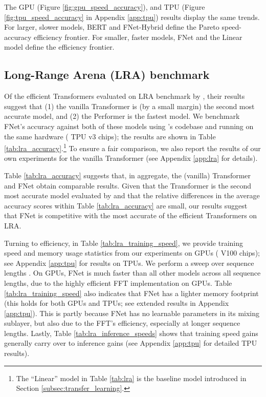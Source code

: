 \documentclass[11pt]{article}
\begin{document}
The GPU (Figure \ref{fig:gpu_speed_accuracy}), and TPU (Figure \ref{fig:tpu_speed_accuracy} in Appendix \ref{app:tpu}) results display the same trends. For larger, slower models, BERT and FNet-Hybrid define the Pareto speed-accuracy efficiency frontier. For smaller, faster models, FNet and the Linear model define the efficiency frontier.

\subsection{Long-Range Arena (LRA) benchmark}
\label{subsec:lra}

Of the efficient Transformers evaluated on LRA benchmark by \citet{tay2020long}, their results suggest that (1) the vanilla Transformer is (by a small margin) the second most accurate model, and (2) the Performer \citep{choromanski2020rethinking} is the fastest model.  We benchmark FNet's accuracy against both of these models using \citet{tay2020long}'s codebase and running on the same hardware ( TPU v3 chips); the results are shown in Table \ref{tab:lra_accuracy}.\footnote{The ``Linear'' model in Table \ref{tab:lra} is the baseline model introduced in Section \ref{subsec:transfer_learning}.} To ensure a fair comparison, we also report the results of our own experiments for the vanilla Transformer (see Appendix \ref{app:lra} for details). 

Table \ref{tab:lra_accuracy} suggests that, in aggregate, the (vanilla) Transformer and FNet obtain comparable results. Given that the Transformer is the second most accurate model evaluated by \citet{tay2020long} and that the relative differences in the average accuracy scores within Table \ref{tab:lra_accuracy} are small, our results suggest that FNet is competitive with the most accurate of the efficient Transformers on LRA.

Turning to efficiency, in Table \ref{tab:lra_training_speed}, we provide training speed and memory usage statistics from our experiments on GPUs ( V100 chips); see Appendix \ref{app:tpu} for results on TPUs. We perform a sweep over sequence lengths . On GPUs, FNet is much faster than all other models across all sequence lengths, due to the highly efficient FFT implementation on GPUs.  Table \ref{tab:lra_training_speed} also indicates that FNet has a lighter memory footprint (this holds for both GPUs and TPUs; see extended results in Appendix \ref{app:tpu}). This is partly because FNet has no learnable parameters in its mixing sublayer, but also due to the FFT's efficiency, especially at longer sequence lengths. Lastly, Table \ref{tab:lra_inference_speeds} shows that training speed gains generally carry over to inference gains (see Appendix \ref{app:tpu} for detailed TPU results).
\end{document}

